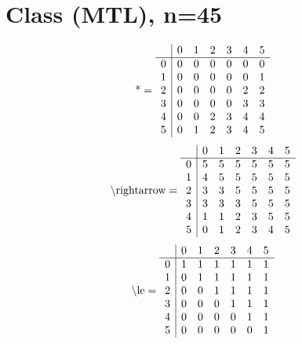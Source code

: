 \documentclass[11pt]{article}
\begin{document}
\section{Class (MTL), n=45}
\[\text{*} = 
\begin{array}{r | r r r r r r}
 & 0 & 1 & 2 & 3 & 4 & 5 \\ \hline
0 & 0 & 0 & 0 & 0 & 0 & 0 \\
1 & 0 & 0 & 0 & 0 & 0 & 1 \\
2 & 0 & 0 & 0 & 0 & 2 & 2 \\
3 & 0 & 0 & 0 & 0 & 3 & 3 \\
4 & 0 & 0 & 2 & 3 & 4 & 4 \\
5 & 0 & 1 & 2 & 3 & 4 & 5 \\
\end{array}
\]
\[\text{\textbackslash rightarrow} = 
\begin{array}{r | r r r r r r}
 & 0 & 1 & 2 & 3 & 4 & 5 \\ \hline
0 & 5 & 5 & 5 & 5 & 5 & 5 \\
1 & 4 & 5 & 5 & 5 & 5 & 5 \\
2 & 3 & 3 & 5 & 5 & 5 & 5 \\
3 & 3 & 3 & 3 & 5 & 5 & 5 \\
4 & 1 & 1 & 2 & 3 & 5 & 5 \\
5 & 0 & 1 & 2 & 3 & 4 & 5 \\
\end{array}
\]
\[\text{\textbackslash le} = 
\begin{array}{r | r r r r r r}
 & 0 & 1 & 2 & 3 & 4 & 5 \\ \hline
0 & 1 & 1 & 1 & 1 & 1 & 1 \\
1 & 0 & 1 & 1 & 1 & 1 & 1 \\
2 & 0 & 0 & 1 & 1 & 1 & 1 \\
3 & 0 & 0 & 0 & 1 & 1 & 1 \\
4 & 0 & 0 & 0 & 0 & 1 & 1 \\
5 & 0 & 0 & 0 & 0 & 0 & 1 \\
\end{array}
\]
\end{document}
